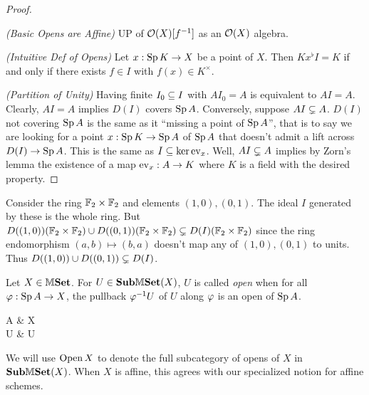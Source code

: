 \documentclass[../main.tex]{subfiles}
\begin{document}
\begin{proof}~

  \textit{(Basic Opens are Affine)}
  UP of $\mathcal{O}(X)[f^{-1}]$ as an $\mathcal{O}(X)$ algebra. 

  \textit{(Intuitive Def of Opens)}
  Let $x : \operatorname{Sp} K \to X$ be a point of $X$.
  Then $Kx^\flat I = K$ if and only if there exists $f \in I$ with 
  $f(x) \in K^\times$.

  \textit{(Partition of Unity)}
  Having finite $I_0 \subseteq I$ with $AI_0 = A$ is equivalent to 
  $AI = A$.
  Clearly, $AI = A$ implies $D(I)$ covers $\operatorname{Sp} A$.
  Conversely, suppose $AI \subsetneq A$.
  $D(I)$ not covering $\operatorname{Sp} A$ is the same as 
  it ``missing a point of $\operatorname{Sp} A$'',
  that is to say we are looking for a point $x : \operatorname{Sp} K \to \operatorname{Sp} A$ of $\operatorname{Sp} A$
  that doesn't admit a lift across $D(I) \to \operatorname{Sp} A$.
  This is the same as $I \subseteq \ker\operatorname{ev}_x$.
  Well, $AI \subsetneq A$ implies by Zorn's lemma the existence of 
  a map $\operatorname{ev}_x : A \to K$ where $K$ is a field with the desired property.
\end{proof}

\begin{ceg}[$\bigcup_{f \in I} D(f) = D(I)$]

  Consider the ring $\mathbb{F}_2 \times \mathbb{F}_2$ and elements $(1,0),(0,1)$.
  The ideal $I$ generated by these is the whole ring. 
  But 
  $D((1,0))(\mathbb{F}_2\times\mathbb{F}_2) \cup D((0,1))(\mathbb{F}_2\times\mathbb{F}_2) 
  \subsetneq D(I)(\mathbb{F}_2\times\mathbb{F}_2)$ since 
  the ring endomorphism $(a,b) \mapsto (b,a)$ doesn't map 
  any of $(1,0),(0,1)$ to units. 
  Thus $D((1,0)) \cup D((0,1)) \subsetneq D(I)$.
\end{ceg}

\begin{dfn}
  
  Let $X \in \mathbb{M}\mathbf{Set}$.
  For $U \in \mathbf{Sub}\mathbb{M}\mathbf{Set}(X)$,
  $U$ is called \emph{open} when 
  for all $\varphi : \operatorname{Sp} A \to X$, the pullback $\varphi^{-1} U$ of $U$ along $\varphi$
  is an open of $\operatorname{Sp} A$.
  \begin{cd}
    \SP A \ar[r,"\ph"] & X \\
    \ph\inv U \ar[u] \ar[r] & U \ar[u]
  \end{cd}
  We will use $\operatorname{Open} X$ to denote the 
  full subcategory of opens of $X$ in $\mathbf{Sub}\mathbb{M}\mathbf{Set}(X)$.
  When $X$ is affine, 
  this agrees with our specialized notion for affine schemes.
\end{dfn}
\end{document}
